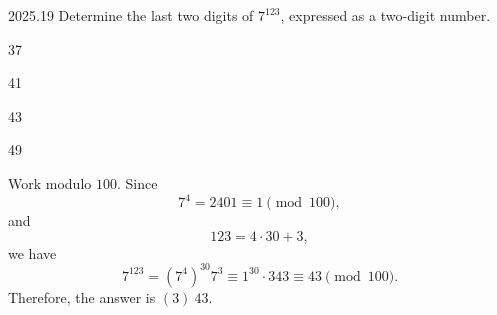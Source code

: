     \begin{pastproblem}{2025.19}
        Determine the last two digits of $7^{123}$, expressed as a two-digit number.
        \begin{problemchoices}
            \item 37
            \item 41
            \item 43
            \item 49
        \end{problemchoices}
    \end{pastproblem}

    \begin{solution}
        Work modulo $100$. Since
        \[
            7^4=2401\equiv 1\pmod{100},
        \]
        and
        \[
            123=4\cdot 30+3,
        \]
        we have
        \[
            7^{123}
            =
            (7^4)^{30}7^3
            \equiv
            1^{30}\cdot 343
            \equiv
            43
            \pmod{100}.
        \]
        Therefore, the answer is $\boxed{(3)\ 43}$.
    \end{solution}

